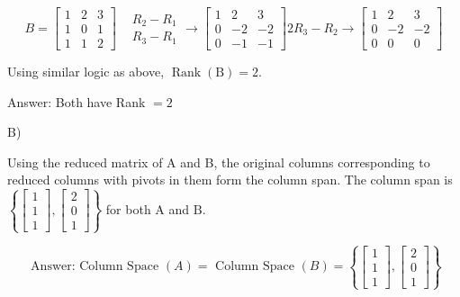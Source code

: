 \documentclass[10pt]{article}
\begin{document}
$$
B=\left[\begin{array}{lll}
1 & 2 & 3 \\
1 & 0 & 1 \\
1 & 1 & 2
\end{array}\right] \begin{aligned}
& R_{2}-R_{1} \\
& R_{3}-R_{1}
\end{aligned} \rightarrow\left[\begin{array}{ccc}
1 & 2 & 3 \\
0 & -2 & -2 \\
0 & -1 & -1
\end{array}\right] 2 R_{3}-R_{2} \rightarrow\left[\begin{array}{ccc}
1 & 2 & 3 \\
0 & -2 & -2 \\
0 & 0 & 0
\end{array}\right]
$$

Using similar logic as above, $\operatorname{Rank}(\mathrm{B})=2$.
\begin{tcolorbox}[colback=red!5!white,colframe=red!75!black]
  \centering Answer: Both have Rank $=2$
\end{tcolorbox}

B)

Using the reduced matrix of A and B, the original columns corresponding to reduced columns with pivots in them form the column span. The column span is $\left\{\left[\begin{array}{l}1 \\ 1 \\ 1\end{array}\right],\left[\begin{array}{l}2 \\ 0 \\ 1\end{array}\right]\right\}$ for both $\mathrm{A}$ and $\mathrm{B}$.
\begin{tcolorbox}[colback=red!5!white,colframe=red!75!black]
  \centering $$
\text { Answer: Column Space }(A)=\text { Column Space }(B)=\left\{\left[\begin{array}{l}
1 \\
1 \\
1
\end{array}\right],\left[\begin{array}{l}
2 \\
0 \\
1
\end{array}\right]\right\}
$$
\end{tcolorbox}
\end{document}
